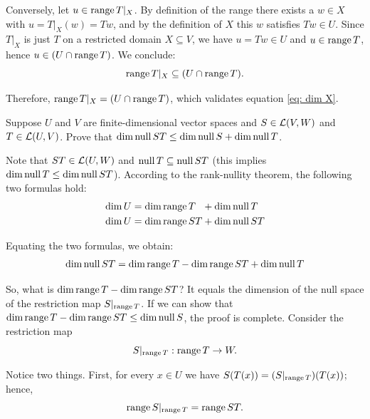 \begin{xrcs}
\begin{xprf}
    Conversely, let $u \in \operatorname{range} T|_X$. By definition of the range there exists a $w \in X$ with $u = T|_X (w) = Tw$, and by the definition of $X$ this $w$ satisfies $Tw \in U$. Since $T|_X$ is just $T$ on a restricted domain $X \subseteq V$, we have $u = Tw \in U$ and $u \in \operatorname{range} T$, hence $u \in (U \cap \operatorname{range} T)$. We conclude:
    \begin{equation}
      \operatorname{range} T|_X \subseteq (U \cap \operatorname{range} T).
    \end{equation}

    Therefore, $\operatorname{range} T|_X = (U \cap \operatorname{range} T)$, which validates equation \eqref{eq: dim X}.
  \end{xprf}
\end{xrcs}

\begin{xrcs}
  Suppose $U$ and $V$ are finite-dimensional vector spaces and $S \in \mathcal{L} (V,W)$ and $T \in \mathcal{L}(U,V)$. Prove that $\dim \operatorname{null} ST \leq \dim \operatorname{null} S + \dim \operatorname{null} T$.

  \begin{xprf}
    Note that $ST \in \mathcal{L}(U,W)$ and $\operatorname{null} T \subseteq \operatorname{null} ST$ (this implies $\dim \operatorname{null} T \leq \dim \operatorname{null} ST$). According to the rank-nullity theorem, the following two formulas hold:
    \begin{equation}
      \begin{aligned}
        \dim U &= \dim \operatorname{range} T\phantom{S} + \dim \operatorname{null} T\phantom{S} \\
        \dim U &= \dim \operatorname{range} ST + \dim \operatorname{null} ST
      \end{aligned}
    \end{equation}

    Equating the two formulas, we obtain:
    \begin{equation}
      \label{eq: dim null ST}
      \dim \operatorname{null} ST = \dim \operatorname{range} T - \dim \operatorname{range} ST + \dim \operatorname{null} T
    \end{equation}

    So, what is $\dim \operatorname{range} T - \dim \operatorname{range} ST$? It equals the dimension of the null space of the restriction map $S|_{\operatorname{range} T}$. If we can show that $\dim \operatorname{range} T - \dim \operatorname{range} ST \leq \dim \operatorname{null} S$, the proof is complete. Consider the restriction map
    \begin{equation}
      S|_{\operatorname{range} T}: \operatorname{range} T \to W.
    \end{equation}

    Notice two things. First, for every $x \in U$ we have $S(T(x)) = (S|_{\operatorname{range} T}) (T(x))$; hence,
    \begin{equation}
      \label{eq: myrange S|_T = myrange ST}
      \operatorname{range} S|_{\operatorname{range} T} = \operatorname{range} ST.
    \end{equation}


\end{xprf}
\end{xrcs}
